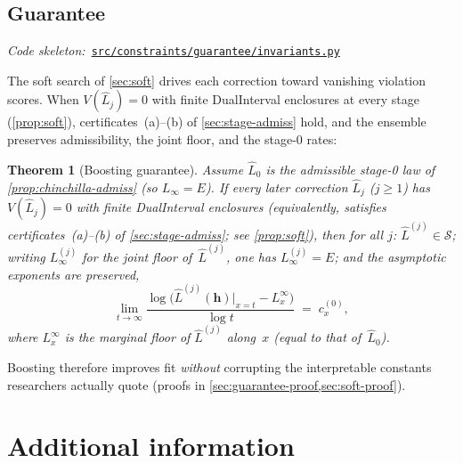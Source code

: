 \documentclass[11pt]{article}
\newcommand{\calS}{\mathcal{S}}
\newcommand{\Lhat}{\hat{L}}
\newcommand{\repoBlob}{https://github.com/krichelj/ByteBoost-Shape-Constrained-Boosted-SR/blob/main/}
\newcommand{\pyFile}[1]{\href{\repoBlob#1}{\nolinkurl{#1}}}
\newcommand{\codeRef}[1]{%
  \par\nobreak\noindent
  {\footnotesize\textit{Code skeleton:}~#1}\par\smallskip}
\theoremstyle{plain}
\newtheorem{theorem}{Theorem}
\theoremstyle{remark}
\begin{document}
\subsection{Guarantee}\label{sec:guarantee}
\codeRef{\pyFile{src/constraints/guarantee/invariants.py}}
The soft search of \cref{sec:soft} drives each correction toward vanishing violation scores.
When $V(\Lhat_j)=0$ with finite DualInterval enclosures at every stage (\cref{prop:soft}), certificates~(a)--(b) of \cref{sec:stage-admiss} hold, and the ensemble preserves admissibility, the joint floor, and the stage-0 rates:
\begin{theorem}[Boosting guarantee]\label{thm:guarantee}
Assume $\Lhat_0$ is the admissible stage-0 law of \cref{prop:chinchilla-admiss} (so $L_\infty = E$).
If every later correction $\Lhat_j$ ($j\geq 1$) has $V(\Lhat_j)=0$ with finite DualInterval enclosures (equivalently, satisfies certificates~(a)--(b) of \cref{sec:stage-admiss}; see \cref{prop:soft}), then for all $j$: $\Lhat^{(j)} \in \calS$; writing $L_\infty^{(j)}$ for the joint floor of~$\Lhat^{(j)}$, one has $L_\infty^{(j)} = E$; and the asymptotic exponents are preserved,
\begin{equation}\label{eq:guarantee-bb}
    \lim_{t \to \infty}
    \frac{\log\bigl(\Lhat^{(j)}(\mathbf{h})\big|_{x=t}
        - L^{\infty}_{x}\bigr)}{\log t}
    \;=\; c_x^{(0)},
\end{equation}
where $L^{\infty}_{x}$ is the marginal floor of $\Lhat^{(j)}$ along~$x$ (equal to that of~$\Lhat_0$).
\end{theorem}
Boosting therefore improves fit \emph{without} corrupting the interpretable constants researchers actually quote (proofs in \cref{sec:guarantee-proof,sec:soft-proof}).

\section{Additional information}\label{sec:additional}
\end{document}
